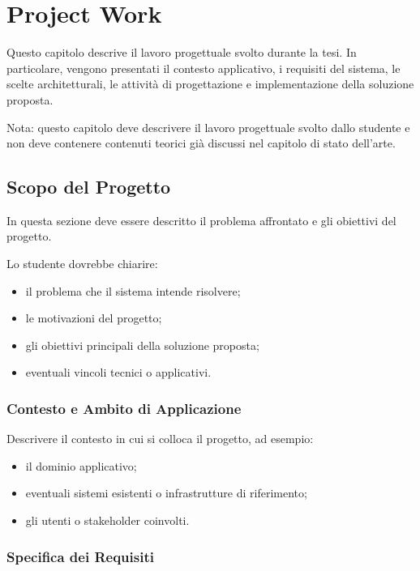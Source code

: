 \chapter{Project Work}

Questo capitolo descrive il lavoro progettuale svolto durante la tesi.
In particolare, vengono presentati il contesto applicativo, i requisiti
del sistema, le scelte architetturali, le attività di progettazione e
implementazione della soluzione proposta.

Nota: questo capitolo deve descrivere il lavoro progettuale svolto
dallo studente e non deve contenere contenuti teorici già discussi
nel capitolo di stato dell’arte.

\section{Scopo del Progetto}

In questa sezione deve essere descritto il problema affrontato e gli
obiettivi del progetto.

Lo studente dovrebbe chiarire:

\begin{itemize}
\item il problema che il sistema intende risolvere;
\item le motivazioni del progetto;
\item gli obiettivi principali della soluzione proposta;
\item eventuali vincoli tecnici o applicativi.
\end{itemize}

\subsection{Contesto e Ambito di Applicazione}

Descrivere il contesto in cui si colloca il progetto, ad esempio:

\begin{itemize}
\item il dominio applicativo;
\item eventuali sistemi esistenti o infrastrutture di riferimento;
\item gli utenti o stakeholder coinvolti.
\end{itemize}

\subsection{Specifica dei Requisiti}


